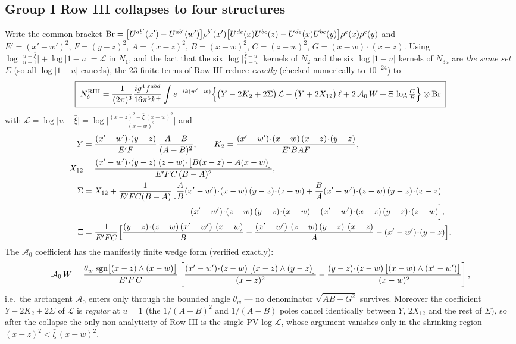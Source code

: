 \documentclass[11pt]{article}
\newcommand{\xib}{\bar{\xi}}
\newcommand{\Azero}{\mathcal{A}_{0}}
\begin{document}
\subsection{Group I Row III collapses to four structures}
Write the common bracket
${\rm Br}=\big[U^{ab'}(x')-U^{ab'}(w')\big]\rho^{b'}(x')
\big[U^{de}(x)U^{bc}(z)-U^{de}(x)U^{bc}(y)\big]\rho^{e}(x)\rho^{c}(y)$ and
$E'=(x'-w')^{2},\,F=(y-z)^{2},\,A=(x-z)^{2},\,B=(x-w)^{2},\,C=(z-w)^{2},\,G=(x-w)\!\cdot\!(x-z)$.
Using $\log\big|\tfrac{u-\xib}{u-1}\big|+\log|1-u|=\mathcal L$ in $N_{1}$, and the fact that the six
$\log\big|\tfrac{\xib-u}{1-u}\big|$ kernels of $N_{2}$ and the six $\log|1-u|$ kernels of
$N_{3a}$ are \emph{the same set} $\Sigma$ (so all $\log|1-u|$ cancels), the 23 finite terms
of Row III reduce \emph{exactly} (checked numerically to $10^{-24}$) to
\begin{equation}
\boxed{\;
N^{\rm RIII}_{\delta}
=\frac{1}{(2\pi)^{3}}\frac{ig^{4}f^{abd}}{16\pi^{5}k^{+}}
\int e^{-ik(w'-w)}\Big\{
\big(Y-2K_{2}+2\Sigma\big)\,\mathcal L
-\big(Y+2X_{12}\big)\,\ell
+2\,\Azero\,W
+\Xi\,\log\tfrac{C}{B}
\Big\}\otimes{\rm Br}\;}
\end{equation}
with $\mathcal L=\log\big|u-\xib\big|=\log\Big|\frac{(x-z)^{2}-\xib\,(x-w)^{2}}{(x-w)^{2}}\Big|$ and
\begin{align*}
Y&=\frac{(x'-w')\!\cdot\!(y-z)}{E'F}\,\frac{A+B}{(A-B)^{2}},\qquad
K_{2}=\frac{(x'-w')\!\cdot\!(x-w)\,(x-z)\!\cdot\!(y-z)}{E'BAF},\\
X_{12}&=\frac{(x'-w')\!\cdot\!(y-z)\;(z-w)\!\cdot\!\big[B(x-z)-A(x-w)\big]}{E'FC\,(B-A)^{2}},\\
\Sigma&=X_{12}
+\frac{1}{E'FC(B-A)}\Big[
\frac{A}{B}(x'-w')\!\cdot\!(x-w)\,(y-z)\!\cdot\!(z-w)
+\frac{B}{A}(x'-w')\!\cdot\!(z-w)\,(y-z)\!\cdot\!(x-z)\\
&\hspace{4.1cm}-(x'-w')\!\cdot\!(z-w)\,(y-z)\!\cdot\!(x-w)
-(x'-w')\!\cdot\!(x-z)\,(y-z)\!\cdot\!(z-w)\Big],\\
\Xi&=\frac{1}{E'FC}\Big[\frac{(y-z)\!\cdot\!(z-w)\,(x'-w')\!\cdot\!(x-w)}{B}
-\frac{(x'-w')\!\cdot\!(z-w)\,(y-z)\!\cdot\!(x-z)}{A}
-(x'-w')\!\cdot\!(y-z)\Big].
\end{align*}
The $\Azero$ coefficient has the manifestly finite wedge form (verified exactly):
\begin{equation}
\Azero\,W=\frac{\theta_{w}\;{\rm sgn}\big[(x-z)\wedge(x-w)\big]}{E'F\,C}
\left[\frac{(x'-w')\!\cdot\!(z-w)\,\big[(x-z)\wedge(y-z)\big]}{(x-z)^{2}}
-\frac{(y-z)\!\cdot\!(z-w)\,\big[(x-w)\wedge(x'-w')\big]}{(x-w)^{2}}\right],
\end{equation}
i.e.\ the arctangent $\Azero$ enters only through the bounded angle $\theta_{w}$ --- no
denominator $\sqrt{AB-G^{2}}$ survives. Moreover the coefficient $Y-2K_{2}+2\Sigma$ of
$\mathcal L$ is \emph{regular} at $u=1$ (the $1/(A-B)^{2}$ and $1/(A-B)$ poles cancel
identically between $Y$, $2X_{12}$ and the rest of $\Sigma$), so after the collapse the only
non-analyticity of Row III is the single PV log $\mathcal L$, whose argument vanishes only
in the shrinking region $(x-z)^{2}<\xib\,(x-w)^{2}$.
\end{document}
